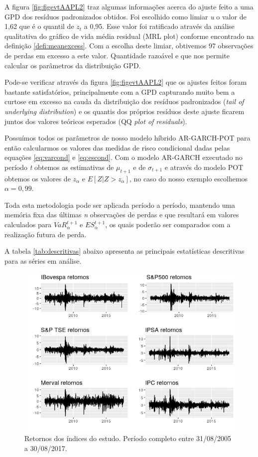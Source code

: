 \documentclass[review]{elsarticle}
\theoremstyle{definition}
\begin{document}
A figura \ref{fig:figevtAAPL2} traz algumas informações acerca do ajuste feito a uma GPD dos resíduos padronizados obtidos. Foi escolhido como limiar \emph{u} o valor de 1,62 que é o quantil de $z_t$ a 0,95. Esse valor foi ratificado através da análise qualitativa do gráfico de vida média residual (MRL plot) conforme encontrado na definição \ref{defi:meanexcess}. Com a escolha deste limiar, obtivemos 97 observações de perdas em excesso a este valor. Quantidade razoável e que nos permite calcular os parâmetros da distribuição GPD.

Pode-se verificar através da figura \ref{fig:figevtAAPL2} que os ajustes feitos foram bastante satisfatórios, principalmente com a GPD capturando muito bem a curtose em excesso na cauda da distribuição dos resíduos padronizados (\emph{tail of underlying distribution}) e os quantis dos próprios resíduos deste ajuste ficarem juntos dos valores teóricos esperados (QQ \emph{plot of residuals}).

Possuímos todos os parâmetros de nosso modelo híbrido AR-GARCH-POT para então calcularmos os valores das medidas de risco condicional dadas pelas equações \eqref{eq:varcond} e \eqref{eq:escond}. Com o modelo AR-GARCH executado no período \emph{t} obtemos as estimativas de $\mu_{t+1}$ e de $\sigma_{t+1}$ e através do modelo POT obtemos os valores de $z_\alpha$ e $E[Z|Z>z_\alpha]$, no caso do nosso exemplo escolhemos $\alpha=0,99$.

Toda esta metodologia pode ser aplicada período a período, mantendo uma memória fixa das últimas \emph{n} observações de perdas e que resultará em valores calculados para $VaR_\alpha^{t+1}$ e $ES_\alpha^{t+1}$, os quais poderão ser comparados com a realização futura de perda.

A tabela \ref{tab:descritivas} abaixo apresenta as principais estatísticas descritivas para as séries em análise.



\begin{figure}[H]
	\centering
	\includegraphics[width=0.9\linewidth]{artigo-retornos}
	\caption{Retornos dos índices do estudo. Período completo entre 31/08/2005 a 30/08/2017.}
	\label{fig:artigo-retornos}
\end{figure}
\end{document}
